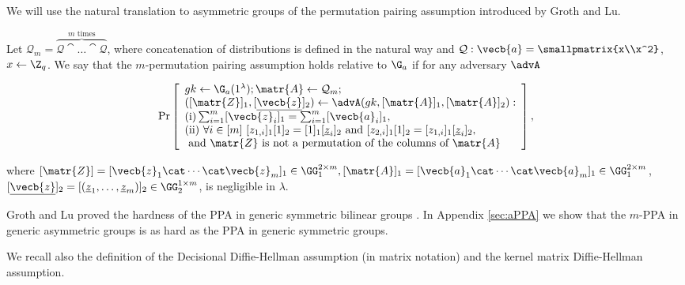 
We will use the natural translation to asymmetric groups of the permutation pairing assumption introduced by Groth and Lu. 
\begin{definition}\label{def:ppa}
Let $\mathcal{Q}_{m}=\overbrace{\mathcal{Q}\cat\ldots\cat\mathcal{Q}}^{m\text{ times}}$, where concatenation of  distributions is defined in the natural way and $\mathcal{Q}: \vecb{a}=\smallpmatrix{x\\x^2}$, $x\gets\Z_q$.
We say that the $m$-permutation pairing assumption holds relative to $\G_a$ if for any adversary $\advA$
\begin{small}$$
\Pr\left[
\begin{array}{l}
	gk\gets\G_a(1^\lambda);\matr{A}\gets\mathcal{Q}_{m};\\
	([\matr{Z}]_1,[\underline{\vecb{z}}]_2)\gets\advA(gk,[\matr{A}]_1,[\matr{A}]_2):\\
	\mathrm{(i)} \sum_{i=1}^m[\vecb{z}_i]_1 = \sum_{i=1}^m[\vecb{a}_i]_1,\\
	\mathrm{(ii)}\ \forall i\in [m] \ [z_{1,i}]_1[1]_2=[1]_1[\underline{z}_{i}]_2 \text{ and } [z_{2,i}]_1[1]_2=[z_{1,i}]_1[\underline{z}_{i}]_2,\\
	\text{ and }\matr{Z}\text{ is not a permutation of the columns of }\matr{A}
\end{array}
\right],
$$\end{small}
where $[\matr{Z}]=[\vecb{z}_1\cat\cdots\cat\vecb{z}_m]_1\in\GG_1^{2\times m}, [\matr{A}]_1=[\vecb{a}_1\cat\cdots\cat\vecb{a}_m]_1\in\GG_1^{2\times m}$, $[\underline{\vecb{z}}]_2=\allowbreak[(\underline{z}_1,\ldots,\allowbreak \underline{z}_m)]_2\in\GG_2^{1\times m}$,
 is negligible in $\lambda$.
\end{definition}
Groth and Lu proved the hardness of the PPA in generic symmetric bilinear groups \cite{AC:GroLu07}. In Appendix \ref{sec:aPPA} we show that the $m$-PPA in generic asymmetric groups is as hard as the PPA in generic symmetric groups.

We recall also the definition of the Decisional Diffie-Hellman assumption (in matrix notation) and the kernel matrix Diffie-Hellman assumption.
